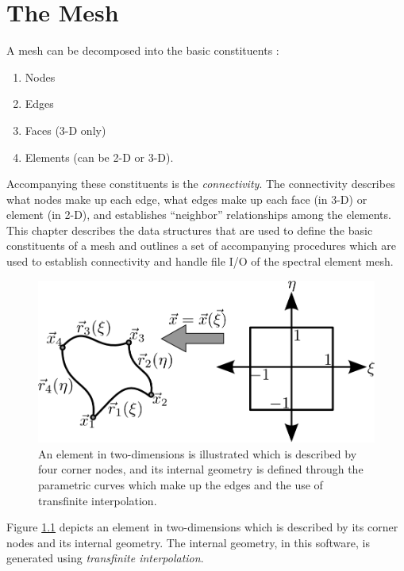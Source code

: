 \documentclass[12pt]{softwaremanual}
\begin{document}
\chapter{The Mesh}
A mesh can be decomposed into the basic constituents :
\begin{enumerate}
\item Nodes
\item Edges
\item Faces (3-D only)
\item Elements (can be 2-D or 3-D).
\end{enumerate}
Accompanying these constituents is the \textit{connectivity}. The connectivity describes what nodes make up each edge, what edges make up each face (in 3-D) or element (in 2-D), and establishes ``neighbor'' relationships among the elements. This chapter describes the data structures that are used to define the basic constituents of a mesh and outlines a set of accompanying procedures which are used to establish connectivity and handle file I/O of the spectral element mesh.
\begin{figure}[h!]
\begin{center}
\includegraphics[scale=0.5]{figures/geometry/element2d.png}
\caption{An element in two-dimensions is illustrated which is described by four corner nodes, and its internal geometry is defined through the parametric curves which make up the edges and the use of transfinite interpolation.} \label{fig:element}
\end{center}
\end{figure}

Figure \ref{fig:element} depicts an element in two-dimensions which is described by its corner nodes and its internal geometry. The internal geometry, in this software, is generated using \textit{transfinite interpolation}.
\end{document}
